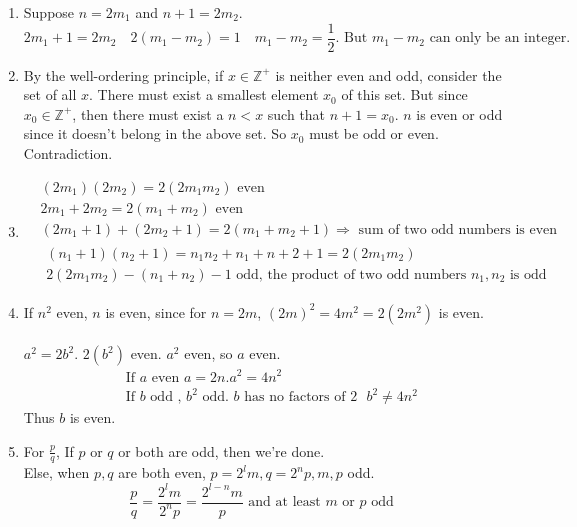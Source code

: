 \documentclass[twoside]{amsart}
\theoremstyle{plain}
\theoremstyle{definition}
\newcommand{\exercisehead}[1]
  {\smallskip
   \noindent{\small\bf Exercise #1.}}
\begin{document}
\exercisehead{10} 
\begin{enumerate}
  \item Suppose $n=2m_1$ and $n+1 = 2 m_2$.  \\
    \[
2m_1 +1 = 2 m_2 \quad 2(m_1 - m_2) = 1 \quad m_1 - m_2 = \frac{1}{2}.  \text{ But $m_1-m_2$ can only be an integer.  }
\]
  \item By the well-ordering principle, if  $x \in \mathbb{Z}^+$ is neither even and odd, consider the set of all $x$.  There must exist a smallest element $x_0$ of this set.  But since $x_0 \in \mathbb{Z}^+$, then there must exist a $n < x$ such that $n +1 = x_0$.  $n$ is even or odd since it doesn't belong in the above set.  So $x_0$ must be odd or even.  Contradiction.  
  \item \[
    \begin{aligned}
      & (2m_1)(2m_2) = 2(2m_1 m_2) \text{ even } \\
      & 2m_1 + 2m_2 = 2(m_1 +m_2) \text{ even }  \\
      & (2m_1+1)+ (2m_2 +1) = 2(m_1+m_2+1) \Longrightarrow \text{ sum of two odd numbers is even } \\
      & 
      \begin{gathered} 
	(n_1+1)(n_2+1) = n_1 n_2 + n_1 + n+2 + 1 = 2(2m_1 m_2)  \\
	2(2m_1 m_2)- (n_1+n_2) -1 \text{ odd, the product of two odd numbers $n_1,n_2$ is odd }
      \end{gathered}
    \end{aligned}
    \]
\item If $n^2$ even, $n$ is even, since for $n=2m$, $(2m)^2 = 4m^2 = 2(2m^2)$ is even.  \\ \, \\
  $a^2 = 2b^2$.  $2(b^2)$ even.  $a^2$ even, so $a$ even.  
  \[
  \begin{aligned}
    &  \text{ If $a$ even } a = 2n.  a^2 = 4 n^2 \\
    &  \text{ If $b$ odd , $b^2$ odd.  $b$ has no factors of $2$ } b^2 \neq 4 n^2  
  \end{aligned}
  \]
Thus $b$ is even.  
\item For $\frac{p}{q}$, If $p$ or $q$ or both are odd, then we're done.  \\
  Else, when $p,q$ are both even, $p=2^l m, q = 2^n p, m, p $ odd.  
  \[
  \frac{p}{q} = \frac{ 2^l m}{ 2^n p} = \frac{ 2^{l-n} m}{p} \text{ and at least $m$ or $p$ odd }
  \]
\end{enumerate}
\end{document}
